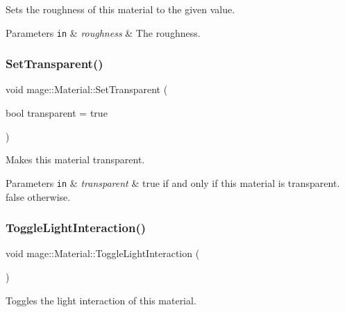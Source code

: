 Sets the roughness of this material to the given value.


\begin{DoxyParams}[1]{Parameters}
\mbox{\tt in}  & {\em roughness} & The roughness. \\
\hline
\end{DoxyParams}
\hypertarget{structmage_1_1_material_abf7e618017185ea05c72d050e89018fe}{}\label{structmage_1_1_material_abf7e618017185ea05c72d050e89018fe} 
\subsubsection{\texorpdfstring{Set\+Transparent()}{SetTransparent()}}
{\footnotesize\ttfamily void mage\+::\+Material\+::\+Set\+Transparent (\begin{DoxyParamCaption}\item[{bool}]{transparent = {\ttfamily true} }\end{DoxyParamCaption})\hspace{0.3cm}{\ttfamily [noexcept]}}

Makes this material transparent.


\begin{DoxyParams}[1]{Parameters}
\mbox{\tt in}  & {\em transparent} & {\ttfamily true} if and only if this material is transparent. {\ttfamily false} otherwise. \\
\hline
\end{DoxyParams}
\hypertarget{structmage_1_1_material_a9c8c15d426461b4a597b9a9947a7bd62}{}\label{structmage_1_1_material_a9c8c15d426461b4a597b9a9947a7bd62} 
\subsubsection{\texorpdfstring{Toggle\+Light\+Interaction()}{ToggleLightInteraction()}}
{\footnotesize\ttfamily void mage\+::\+Material\+::\+Toggle\+Light\+Interaction (\begin{DoxyParamCaption}{ }\end{DoxyParamCaption})\hspace{0.3cm}{\ttfamily [noexcept]}}

Toggles the light interaction of this material. 

